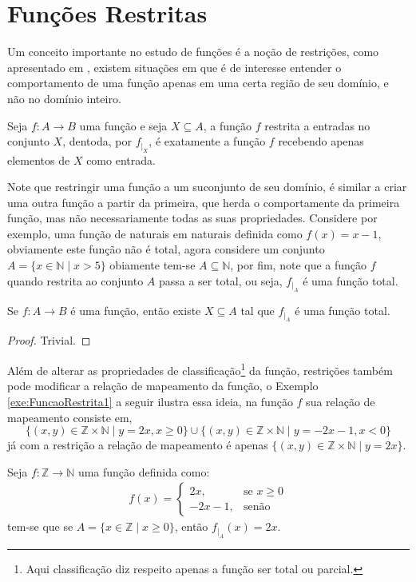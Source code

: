\section{Funções Restritas}\label{sec:FuncoesRestritas}

Um conceito importante no estudo de funções é a noção de restrições, como apresentado em \cite{lipschutz1978-TC}, existem situações em que é de interesse entender o comportamento de uma função apenas em uma certa região de seu domínio, e não no domínio inteiro.

\begin{definicao}
	Seja $f: A \rightarrow B$ uma função e seja $X \subseteq A$, a função $f$ restrita a entradas no conjunto $X$, dentoda, por $f_{\mid_X}$, é exatamente a função $f$ recebendo apenas elementos de $X$ como entrada.
\end{definicao}

Note que restringir uma função a um suconjunto de seu domínio, é similar a criar uma outra função a partir da primeira, que herda o comportamente da primeira função, mas não necessariamente todas as suas propriedades. Considere por exemplo, uma função de naturais em naturais definida como $f(x) = x - 1$, obviamente este função não é total, agora considere um conjunto $A = \{x \in \mathbb{N} \mid x > 5 \}$ obiamente tem-se $A \subseteq \mathbb{N}$, por fim, note que a função $f$ quando restrita ao conjunto $A$ passa a ser total, ou seja, $f_{\mid_A}$ é uma função total.

\begin{proposicao}
	Se $f: A \rightarrow B$ é uma função, então existe $X \subseteq A$ tal que $f_{\mid_A}$ é uma função total.
\end{proposicao}

\begin{proof}
	Trivial.
\end{proof}

Além de alterar as propriedades de classificação\footnote{Aqui classificação diz respeito apenas a função ser total ou parcial.} da função, restrições também pode modificar a relação de mapeamento da função, o Exemplo \ref{exe:FuncaoRestrita1} a seguir ilustra essa ideia, na função $f$ sua relação de mapeamento consiste em, 
$$\{(x, y) \in  \mathbb{Z} \times \mathbb{N} \mid y = 2x, x \geq 0\} \cup \{(x, y) \in  \mathbb{Z} \times \mathbb{N} \mid y = -2x-1, x < 0\}$$
já com a restrição a relação de mapeamento é apenas $\{(x, y) \in  \mathbb{Z} \times \mathbb{N} \mid y = 2x\}$.

\begin{exemplo}\label{exe:FuncaoRestrita1}
	Seja $f: \mathbb{Z} \rightarrow \mathbb{N}$ uma função definida como:
	\begin{eqnarray*}
		f(x) = \left\{\begin{array}{ll}
			2x, & \text{se } x \geq 0\\
			-2x - 1, & \text{senão}
		\end{array}\right.
	\end{eqnarray*}
	tem-se que se $A = \{x \in \mathbb{Z} \mid x \geq 0 \}$, então $f_{\mid_A}(x) = 2x$.
\end{exemplo}

